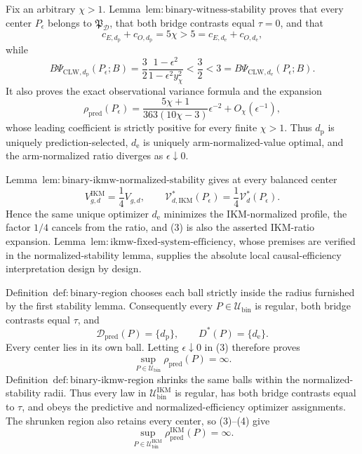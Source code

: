 Fix an arbitrary \(\chi>1\). Lemma~\(\mathrm{lem{:}binary\text{-}witness\text{-}stability}\) proves that every center \(P_\epsilon\) belongs to \(\mathfrak P_{\mathcal D}\), that both bridge contrasts equal \(\tau=0\), and that
\[
 c_{E,d_{\mathrm p}}+c_{O,d_{\mathrm p}}=5\chi>5
 =c_{E,d_{\mathrm e}}+c_{O,d_{\mathrm e}}, \tag{1}
\]
while
\[
 B\Psi_{\mathrm{CLW},d_{\mathrm p}}(P_\epsilon;B)
 =\frac32\frac{1-\epsilon^2}{1-\epsilon^2y_\chi^2}
 <\frac32<3
 =B\Psi_{\mathrm{CLW},d_{\mathrm e}}(P_\epsilon;B). \tag{2}
\]
It also proves the exact observational variance formula and the expansion
\[
 \rho_{\mathrm{pred}}(P_\epsilon)
 =\frac{5\chi+1}{363(10\chi-3)}\epsilon^{-2}
 +O_\chi(\epsilon^{-1}), \tag{3}
\]
whose leading coefficient is strictly positive for every finite \(\chi>1\). Thus \(d_{\mathrm p}\) is uniquely prediction-selected, \(d_{\mathrm e}\) is uniquely arm-normalized-value optimal, and the arm-normalized ratio diverges as \(\epsilon\downarrow0\).

Lemma~\(\mathrm{lem{:}binary\text{-}ikmw\text{-}normalized\text{-}stability}\) gives at every balanced center
\[
 V_{g,d}^{\mathrm{IKM}}=\frac14V_{g,d},
 \qquad
 \mathcal V_{d,\mathrm{IKM}}^*(P_\epsilon)
 =\frac14\mathcal V_d^*(P_\epsilon). \tag{4}
\]
Hence the same unique optimizer \(d_{\mathrm e}\) minimizes the IKM-normalized profile, the factor \(1/4\) cancels from the ratio, and (3) is also the asserted IKM-ratio expansion. Lemma~\(\mathrm{lem{:}ikmw\text{-}fixed\text{-}system\text{-}efficiency}\), whose premises are verified in the normalized-stability lemma, supplies the absolute local causal-efficiency interpretation design by design.

Definition~\(\mathrm{def{:}binary\text{-}region}\) chooses each ball strictly inside the radius furnished by the first stability lemma. Consequently every \(P\in\mathcal U_{\mathrm{bin}}\) is regular, both bridge contrasts equal \(\tau\), and
\[
 \mathcal D_{\mathrm{pred}}(P)=\{d_{\mathrm p}\},
 \qquad D^*(P)=\{d_{\mathrm e}\}. \tag{5}
\]
Every center lies in its own ball. Letting \(\epsilon\downarrow0\) in (3) therefore proves
\[
 \sup_{P\in\mathcal U_{\mathrm{bin}}}\rho_{\mathrm{pred}}(P)=\infty. \tag{6}
\]
Definition~\(\mathrm{def{:}binary\text{-}ikmw\text{-}region}\) shrinks the same balls within the normalized-stability radii. Thus every law in \(\mathcal U_{\mathrm{bin}}^{\mathrm{IKM}}\) is regular, has both bridge contrasts equal to \(\tau\), and obeys the predictive and normalized-efficiency optimizer assignments. The shrunken region also retains every center, so (3)--(4) give
\[
 \sup_{P\in\mathcal U_{\mathrm{bin}}^{\mathrm{IKM}}}
 \rho_{\mathrm{pred}}^{\mathrm{IKM}}(P)=\infty. \tag{7}
\]

